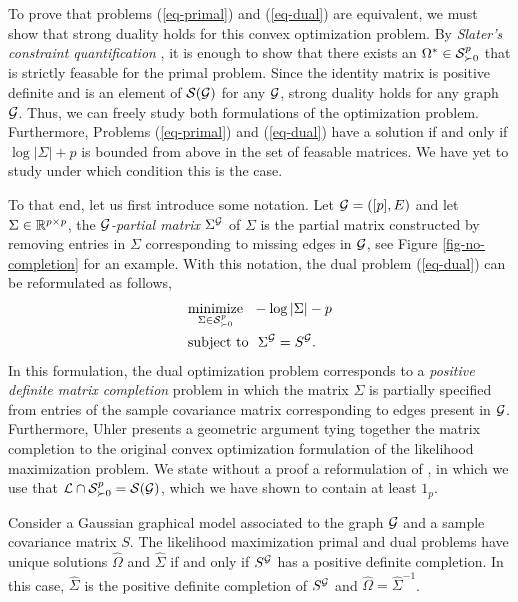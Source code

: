 To prove that problems (\ref{eq-primal}) and (\ref{eq-dual}) are equivalent, we must show that strong duality holds for this convex optimization problem. By \textit{Slater's constraint quantification} \cite[Section 5.3.2]{boyd2004convex}, it is enough to show that there exists an $\Omega^* \in \S^p_{\succ 0}$ that is strictly feasable for the primal problem. Since the identity matrix is positive definite and is an element of $\S(\G)$ for any $\G$, strong duality holds for any graph $\G$. Thus, we can freely study both formulations of the optimization problem. Furthermore, Problems (\ref{eq-primal}) and (\ref{eq-dual}) have a solution if and only if $\log |\Sigma| + p$ is bounded from above in the set of feasable matrices. We have yet to study under which condition this is the case.

To that end, let us first introduce some notation. Let $\G = ([p], E)$ and let $\Sigma \in \R^{p\times p}$, the \textit{$\G$-partial matrix} $\Sigma^\G$ of $\Sigma$ is the partial matrix constructed by removing entries in $\Sigma$ corresponding to missing edges in $\G$, see Figure \ref{fig-no-completion} for an example. With this notation, the dual problem (\ref{eq-dual}) can be reformulated as follows,
\begin{align} \label{eq-completion}
    \begin{split}    
        &\underset{\Sigma \in \S^p_{\succ 0}}{\t{minimize}}\ \  -\log |\Sigma| - p\\
        &\t{subject to}\ \ \Sigma^\G = S^\G.
    \end{split}
\end{align}
In this formulation, the dual optimization problem corresponds to a \textit{positive definite matrix completion} problem in which the matrix $\Sigma$ is partially specified from entries of the sample covariance matrix corresponding to edges present in $\G$. Furthermore, Uhler \cite[Section 9.4]{maathuis2018handbook} presents a geometric argument tying together the matrix completion to the original convex optimization formulation of the likelihood maximization problem. We state without a proof a reformulation of \cite[Theorem 9.4.2]{maathuis2018handbook}, in which we use that $\c{L} \cap \S^p_{\succ 0} = \S(\G)$, which we have shown to contain at least $1_p$.

\begin{theorem}
    Consider a Gaussian graphical model associated to the graph $\G$ and a sample covariance matrix $S$. The likelihood maximization primal and dual problems have unique solutions $\hat\Omega$ and $\hat\Sigma$ if and only if $S^\G$ has a positive definite completion. In this case, $\hat\Sigma$ is the positive definite completion of $S^\G$ and $\hat\Omega = \hat\Sigma^{-1}$.
\end{theorem}

